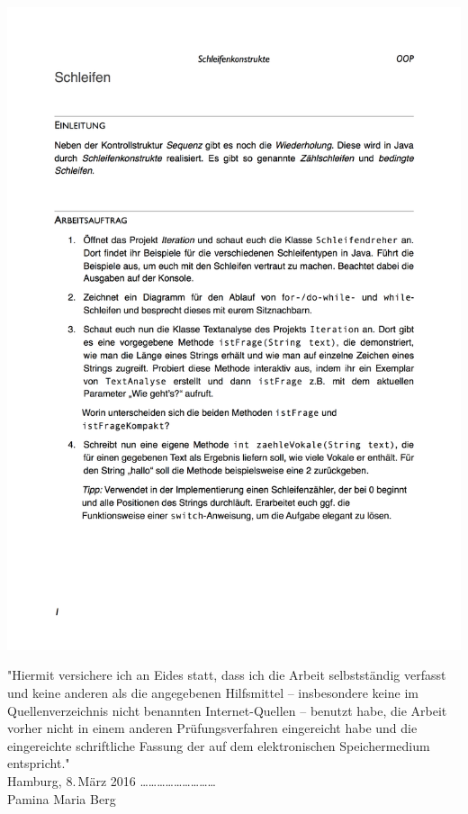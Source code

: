 \documentclass[paper=a4, DIV=13, BCOR=12mm, twoside=on, onecolumn=on, open = any, titlepage =on, parskip =half-, headsepline = on, footsepline = on, chapterprefix = on, sectionprefix = on, appendixprefix = off, fontsize = 11pt, numbers = noenddot, abstract = off]{scrreprt}
\begin{document}
\newpage

\newpage


\includegraphics[height=\textheight]{images/AB_Schleifenkonstrukte.png}

\cleardoublepage
\newpage
\thispagestyle{empty}
\vspace*{\fill}
"Hiermit versichere ich an Eides statt, dass ich die Arbeit selbstständig verfasst und keine anderen als die angegebenen Hilfsmittel – insbesondere keine im Quellenverzeichnis nicht benannten Internet-Quellen – benutzt habe, die Arbeit vorher nicht in einem anderen Prüfungsverfahren eingereicht habe und die eingereichte schriftliche Fassung der auf dem elektronischen Speichermedium entspricht."\\

Hamburg, 8.\,März 2016 \hspace*{\fill} \dots \dots \dots \dots \dots \dots \dots \dots \dots\\
\hspace*{\fill} Pamina Maria Berg \quad $\,$
\end{document}
